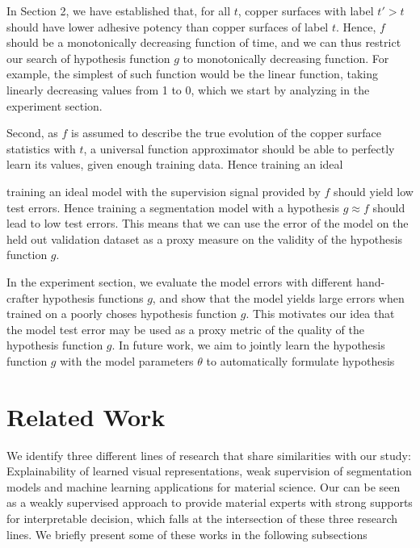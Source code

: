 \documentclass[10pt,twocolumn,letterpaper]{article}
\begin{document}
In Section 2, we have established that, for all $t$, 
copper surfaces with label $t' > t$ should have lower adhesive potency than copper surfaces of label $t$.
Hence, $f$ should be a monotonically decreasing function of time,
and we can thus restrict our search of hypothesis function $g$ to monotonically decreasing function.
For example, the simplest of such function would be the linear function, 
taking linearly decreasing values from 1 to 0,
which we start by analyzing in the experiment section.

Second, as $f$ is assumed to describe the true evolution of the copper surface statistics with $t$,
a universal function approximator should be able to perfectly learn its values, given enough training data.
Hence training an ideal 

training an ideal model with the supervision signal provided by $f$ should yield low test errors.
Hence training a segmentation model with a hypothesis $g \approx f$ should lead to low test errors.
This means that we can use the error of the model on the held out validation dataset as a proxy measure on
the validity of the hypothesis function $g$.

In the experiment section, we evaluate the model errors with different hand-crafter hypothesis functions $g$,
and show that the model yields large errors when trained on a poorly choses hypothesis function $g$.
This motivates our idea that the model test error may be used as a proxy metric of the quality of the hypothesis function $g$.
In future work, we aim to jointly learn the hypothesis function $g$ with the model parameters $\theta$ to automatically
formulate hypothesis


\section{Related Work}

We identify three different lines of research that share similarities with our study:
Explainability of learned visual representations, 
weak supervision of segmentation models and 
machine learning applications for material science.
Our can be seen as a weakly supervised approach to provide material 
experts with strong supports for interpretable decision, 
which falls at the intersection of these three research lines.
We briefly present some of these works in the following subsections
\end{document}
